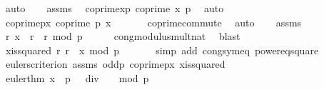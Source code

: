 \begin{isabellebody}
\ auto\isanewline
\ \ \isamarkupfalse%
\ assms{\isacharparenleft}{\kern0pt}{}{\isacharparenright}{\kern0pt}\ \isamarkupfalse%
\ coprime{\isacharunderscore}{\kern0pt}xp{\isacharcolon}{\kern0pt}\ {\isachardoublequoteopen}coprime\ x\ p{\isachardoublequoteclose}\ \isamarkupfalse%
\ auto\isanewline
\ \ \isamarkupfalse%
\ \isamarkupfalse%
\ coprime{\isacharunderscore}{\kern0pt}px{\isacharcolon}{\kern0pt}\ {\isachardoublequoteopen}coprime\ p\ x{\isachardoublequoteclose}\ \isanewline
\ \ \ \ \isamarkupfalse%
\ coprime{\isacharunderscore}{\kern0pt}commute\ \isamarkupfalse%
\ auto\isanewline
\ \ \isamarkupfalse%
\ assms{\isacharparenleft}{\kern0pt}{}{\isacharparenright}{\kern0pt}\ \isamarkupfalse%
\ {\isachardoublequoteopen}{\isasymexists}r{\isachardot}{\kern0pt}\ {\isacharbrackleft}{\kern0pt}x\ {\isacharequal}{\kern0pt}\ r\ {\isacharasterisk}{\kern0pt}\ r{\isacharbrackright}{\kern0pt}\ {\isacharparenleft}{\kern0pt}mod\ p{\isacharparenright}{\kern0pt}{\isachardoublequoteclose}\isanewline
\ \ \ \ \isamarkupfalse%
\ cong{\isacharunderscore}{\kern0pt}modulus{\isacharunderscore}{\kern0pt}mult{\isacharunderscore}{\kern0pt}nat\ \isamarkupfalse%
\ blast\isanewline
\ \ \isamarkupfalse%
\ \isamarkupfalse%
\ x{\isacharunderscore}{\kern0pt}is{\isacharunderscore}{\kern0pt}squared{\isacharcolon}{\kern0pt}\ {\isachardoublequoteopen}{\isasymexists}r{\isachardot}{\kern0pt}\ {\isacharbrackleft}{\kern0pt}r{\isacharcircum}{\kern0pt}{}\ {\isacharequal}{\kern0pt}\ x{\isacharbrackright}{\kern0pt}\ {\isacharparenleft}{\kern0pt}mod\ p{\isacharparenright}{\kern0pt}{\isachardoublequoteclose}\ \isanewline
\ \ \ \ \isamarkupfalse%
\ {\isacharparenleft}{\kern0pt}simp\ add{\isacharcolon}{\kern0pt}\ cong{\isacharunderscore}{\kern0pt}sym{\isacharunderscore}{\kern0pt}eq\ power{}{\isacharunderscore}{\kern0pt}eq{\isacharunderscore}{\kern0pt}square{\isacharparenright}{\kern0pt}\isanewline
\isanewline
\ \ \isamarkupfalse%
\ eulers{\isacharunderscore}{\kern0pt}criterion\ assms{\isacharparenleft}{\kern0pt}{}{\isacharparenright}{\kern0pt}\ odd{\isacharunderscore}{\kern0pt}p\ coprime{\isacharunderscore}{\kern0pt}px\ x{\isacharunderscore}{\kern0pt}is{\isacharunderscore}{\kern0pt}squared\ \isamarkupfalse%
\ euler{\isacharunderscore}{\kern0pt}thm{\isacharcolon}{\kern0pt}\ {\isachardoublequoteopen}{\isacharbrackleft}{\kern0pt}x\ {\isacharcircum}{\kern0pt}\ {\isacharparenleft}{\kern0pt}{\isacharparenleft}{\kern0pt}p\ {\isacharminus}{\kern0pt}\ {}{\isacharparenright}{\kern0pt}\ div\ {}{\isacharparenright}{\kern0pt}\ {\isacharequal}{\kern0pt}\ {}{\isacharbrackright}{\kern0pt}\ {\isacharparenleft}{\kern0pt}mod\ p{\isacharparenright}{\kern0pt}{\isachardoublequoteclose}\ \isanewline

\end{isabellebody}
